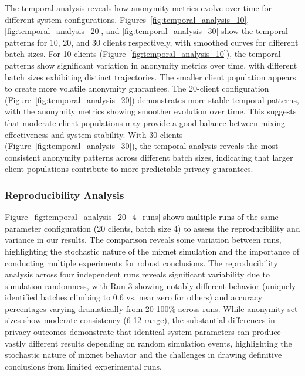 \documentclass{article}
\begin{document}
The temporal analysis reveals how anonymity metrics evolve 
over time for different system configurations. 
Figures~\ref{fig:temporal_analysis_10}, \ref{fig:temporal_analysis_20}, 
and \ref{fig:temporal_analysis_30} show the temporal patterns 
for 10, 20, and 30 clients respectively, with smoothed curves 
for different batch sizes. For 10 clients (Figure~\ref{fig:temporal_analysis_10}), 
the temporal patterns show significant variation in anonymity 
metrics over time, with different batch sizes exhibiting 
distinct trajectories. The smaller client population appears 
to create more volatile anonymity guarantees. The 20-client 
configuration (Figure~\ref{fig:temporal_analysis_20}) 
demonstrates more stable temporal patterns, with the anonymity 
metrics showing smoother evolution over time. This suggests 
that moderate client populations may provide a good balance 
between mixing effectiveness and system stability. With 30 clients 
(Figure~\ref{fig:temporal_analysis_30}), the temporal analysis 
reveals the most consistent anonymity patterns across different 
batch sizes, indicating that larger client populations contribute 
to more predictable privacy guarantees.

\subsubsection{Reproducibility Analysis}

Figure~\ref{fig:temporal_analysis_20_4_runs} shows multiple 
runs of the same parameter configuration (20 clients, batch size 4) 
to assess the reproducibility and variance in our results. 
The comparison reveals some variation between runs, highlighting 
the stochastic nature of the mixnet simulation and the importance 
of conducting multiple experiments for robust conclusions. The 
reproducibility analysis across four independent runs reveals 
significant variability due to simulation randomness, with Run 3 
showing notably different behavior (uniquely identified batches 
climbing to 0.6 vs. near zero for others) and accuracy percentages 
varying dramatically from 20-100\% across runs. While anonymity 
set sizes show moderate 
consistency (6-12 range), the substantial differences 
in privacy outcomes demonstrate that identical system 
parameters can produce vastly different results depending 
on random simulation events, highlighting the stochastic 
nature of mixnet behavior and the challenges in drawing 
definitive conclusions from limited experimental runs.
\end{document}
